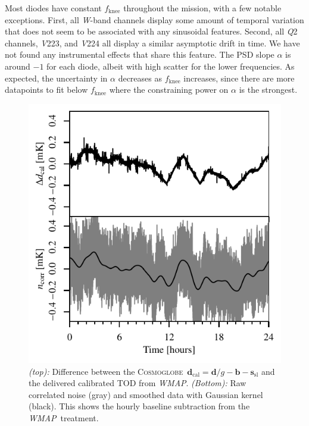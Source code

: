 \documentclass[twocolumn]{../../common/aa}
\def\WMAP{\emph{WMAP}}
\newcommand{\cosmoglobe}{\textsc{Cosmoglobe}}
\newcommand{\Q}[0]{\textit Q}
\newcommand{\V}[0]{\textit V}
\newcommand{\W}[0]{\textit W}
\begin{document}
Most diodes have constant $f_\mathrm{knee}$ throughout the mission, with a few notable exceptions. First, all \W-band channels display some amount of temporal variation that does not seem to be associated with any sinusoidal features. Second, all \Q2 channels, \V223, and \V224 all display a similar asymptotic drift in time. We have not found any instrumental effects that share this feature.
The PSD slope $\alpha$ is around $-1$ for each diode, albeit with high scatter for the lower frequencies. As expected, the uncertainty in $\alpha$ decreases as $f_\mathrm{knee}$ increases, since there are more datapoints to fit below $f_\mathrm{knee}$ where the constraining power on $\alpha$ is the strongest.

\begin{figure}
	\includegraphics[width=\columnwidth]{figures/K113_TOD_diff_10hr.pdf}
	\caption{\textit{(top):} Difference between the \cosmoglobe\ $\boldsymbol d_\mathrm{cal}=\boldsymbol d/g-\boldsymbol b - \boldsymbol s_\mathrm{sl}$ and the delivered calibrated TOD from \WMAP. \textit{(Bottom):} Raw correlated noise (gray) and smoothed data with Gaussian kernel (black). This shows the hourly baseline subtraction from the \WMAP\ treatment.}
	\label{fig:cal_comp}
\end{figure}
\end{document}
